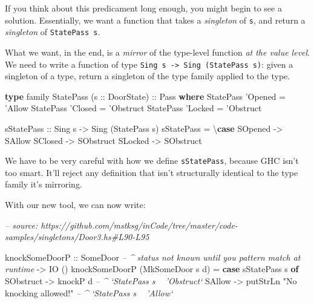 \documentclass[]{article}
\newenvironment{Shaded}{}{}
\newcommand{\CommentTok}[1]{\textcolor[rgb]{0.38,0.63,0.69}{\textit{#1}}}
\newcommand{\DataTypeTok}[1]{\textcolor[rgb]{0.56,0.13,0.00}{#1}}
\newcommand{\FunctionTok}[1]{\textcolor[rgb]{0.02,0.16,0.49}{#1}}
\newcommand{\KeywordTok}[1]{\textcolor[rgb]{0.00,0.44,0.13}{\textbf{#1}}}
\newcommand{\NormalTok}[1]{#1}
\newcommand{\OtherTok}[1]{\textcolor[rgb]{0.00,0.44,0.13}{#1}}
\newcommand{\StringTok}[1]{\textcolor[rgb]{0.25,0.44,0.63}{#1}}
\begin{document}
If you think about this predicament long enough, you might begin to see a
solution. Essentially, we want a function that takes a \emph{singleton} of
\texttt{s}, and return a \emph{singleton} of \texttt{StatePass\ s}.

What we want, in the end, is a \emph{mirror} of the type-level function \emph{at
the value level}. We need to write a function of type
\texttt{Sing\ s\ -\textgreater{}\ Sing\ (StatePass\ s)}: given a singleton of a
type, return a singleton of the type family applied to the type.

\begin{Shaded}
\begin{Highlighting}[]
\KeywordTok{type}\NormalTok{ family }\DataTypeTok{StatePass}\NormalTok{ (}\OtherTok{s ::} \DataTypeTok{DoorState}\NormalTok{)}\OtherTok{ ::} \DataTypeTok{Pass} \KeywordTok{where}
    \DataTypeTok{StatePass}\NormalTok{ '}\DataTypeTok{Opened} \FunctionTok{=}\NormalTok{ '}\DataTypeTok{Allow}
    \DataTypeTok{StatePass}\NormalTok{ '}\DataTypeTok{Closed} \FunctionTok{=}\NormalTok{ '}\DataTypeTok{Obstruct}
    \DataTypeTok{StatePass}\NormalTok{ '}\DataTypeTok{Locked} \FunctionTok{=}\NormalTok{ '}\DataTypeTok{Obstruct}

\OtherTok{sStatePass ::} \DataTypeTok{Sing}\NormalTok{ s }\OtherTok{->} \DataTypeTok{Sing}\NormalTok{ (}\DataTypeTok{StatePass}\NormalTok{ s)}
\NormalTok{sStatePass }\FunctionTok{=}\NormalTok{ \textbackslash{}}\KeywordTok{case}
    \DataTypeTok{SOpened} \OtherTok{->} \DataTypeTok{SAllow}
    \DataTypeTok{SClosed} \OtherTok{->} \DataTypeTok{SObstruct}
    \DataTypeTok{SLocked} \OtherTok{->} \DataTypeTok{SObstruct}
\end{Highlighting}
\end{Shaded}

We have to be very careful with how we define \texttt{sStatePass}, because GHC
isn't too smart. It'll reject any definition that isn't structurally identical
to the type family it's mirroring.

With our new tool, we can now write:

\begin{Shaded}
\begin{Highlighting}[]
\CommentTok{-- source: https://github.com/mstksg/inCode/tree/master/code-samples/singletons/Door3.hs#L90-L95}

\NormalTok{knockSomeDoorP}
\OtherTok{    ::} \DataTypeTok{SomeDoor}     \CommentTok{-- ^ status not known until you pattern match at runtime}
    \OtherTok{->} \DataTypeTok{IO}\NormalTok{ ()}
\NormalTok{knockSomeDoorP (}\DataTypeTok{MkSomeDoor}\NormalTok{ s d) }\FunctionTok{=} \KeywordTok{case}\NormalTok{ sStatePass s }\KeywordTok{of}
    \DataTypeTok{SObstruct} \OtherTok{->}\NormalTok{ knockP d                        }\CommentTok{-- ^ `StatePass s ~ 'Obstruct`}
    \DataTypeTok{SAllow}    \OtherTok{->}\NormalTok{ putStrLn }\StringTok{"No knocking allowed!"} \CommentTok{-- ^ `StatePass s ~ 'Allow`}
\end{Highlighting}
\end{Shaded}
\end{document}
